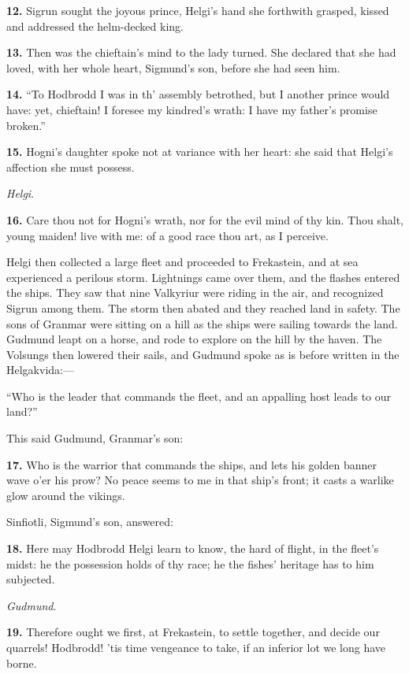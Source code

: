 \textbf{12.} Sigrun sought the joyous prince, Helgi's hand she forthwith
grasped, kissed and addressed the helm-decked king.

\textbf{13.} Then was the chieftain's mind to the lady turned. She declared
that she had loved, with her whole heart, Sigmund's son, before she
had seen him.

\textbf{14.} ``To Hodbrodd I was in th' assembly betrothed, but I another
prince would have: yet, chieftain! I foresee my kindred's wrath: I
have my father's promise broken.''

\textbf{15.} Hogni's daughter spoke not at variance with her heart: she said
that Helgi's affection she must possess.

\emph{Helgi}.

\textbf{16.} Care thou not for Hogni's wrath, nor for the evil mind of thy
kin. Thou shalt, young maiden! live with me: of a good race thou art,
as I perceive.

Helgi then collected a large fleet and proceeded to Frekastein, and at
sea experienced a perilous storm. Lightnings came over them, and the
flashes entered the ships. They saw that nine Valkyriur were riding in
the air, and recognized Sigrun among them. The storm then abated and
they reached land in safety. The sons of Granmar were sitting on a
hill as the ships were sailing towards the land. Gudmund leapt on a
horse, and rode to explore on the hill by the haven. The Volsungs then
lowered their sails, and Gudmund spoke as is before written in the
Helgakvida:—

``Who is the leader that commands the fleet, and an appalling host
leads to our land?''

This said Gudmund, Granmar's son:

\textbf{17.} Who is the warrior that commands the ships, and lets his golden
banner wave o'er his prow? No peace seems to me in that ship's front;
it casts a warlike glow around the vikings.

Sinfiotli, Sigmund's son, answered:

\textbf{18.} Here may Hodbrodd Helgi learn to know, the hard of flight, in
the fleet's midst: he the possession holds of thy race; he the fishes'
heritage has to him subjected.

\emph{Gudmund}.

\textbf{19.} Therefore ought we first, at Frekastein, to settle together, and
decide our quarrels! Hodbrodd! 'tis time vengeance to take, if an
inferior lot we long have borne.

